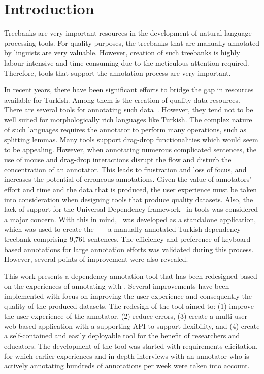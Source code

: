 \section{Introduction}
\label{sec:introduction}

Treebanks are very important resources in the development of natural language processing tools.
For quality purposes, the treebanks that are manually annotated by linguists are very valuable. 
However, creation of such treebanks is highly labour-intensive and time-consuming due to the meticulous attention required.
Therefore, tools that support the annotation process are very important. 

In recent years, there have been significant efforts to bridge the gap in resources available for Turkish. 
Among them is the creation of quality data resources. 
There are several tools for annotating such data~\cite{brat,dgannotator}. 
However, they tend not to be well suited for morphologically rich languages like Turkish.
The complex nature of such languages requires the annotator to perform many operations, such as splitting lemmas.
Many tools support drag-drop functionalities which would seem to be appealing. 
However, when annotating numerous complicated sentences, the use of mouse and drag-drop interactions disrupt the flow and disturb the concentration of an annotator. 
This leads to frustration and loss of focus, and increases the potential of erroneous annotations.
Given the value of annotators' effort and time and the data that is produced, the user experience must be taken into consideration when designing tools that produce quality datasets. 
Also, the lack of support for the Universal Dependency framework~\cite{UD} in tools was considered a major concern.
With this in mind, \boatvone\ was developed as a standalone application, which was used to create the \bountreebank~\cite{turk-etal-2019-turkish,trk2020resources,UD-Boun-Treebank} -- a manually annotated Turkish dependency treebank comprising 9,761 sentences.
The efficiency and preference of keyboard-based annotations for large annotation efforts was validated during this process. 
However, several points of improvement were also revealed.  

This work presents a dependency annotation tool that has been redesigned based on the experiences of annotating with \boatvone.
Several improvements have been implemented with focus on improving the user experience and consequently the quality of the produced datasets.
The redesign of the tool aimed to: (1) improve the user experience of the annotator, (2) reduce errors, (3) create a multi-user web-based application with a supporting API to support flexibility, and (4) create a self-contained and easily deployable tool for the benefit of researchers and educators. 
The development of the tool was started with requirements elicitation, for which earlier experiences and in-depth interviews with an annotator who is actively annotating hundreds of annotations per week were taken into account.

